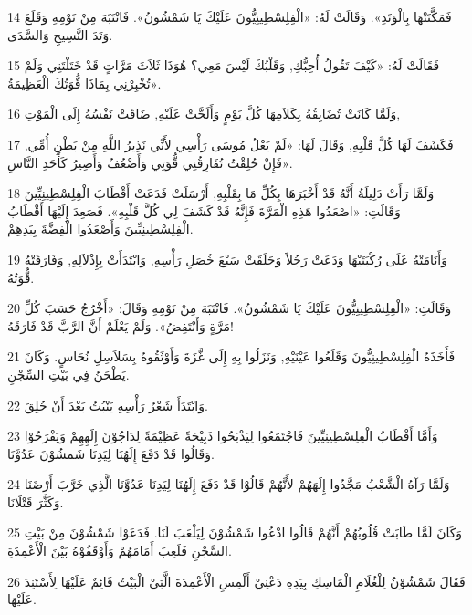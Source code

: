 \par 14 فَمَكَّنَتْهَا بِالْوَتَدِ». وَقَالَتْ لَهُ: «الْفِلِسْطِينِيُّونَ عَلَيْكَ يَا شَمْشُونُ». فَانْتَبَهَ مِنْ نَوْمِهِ وَقَلَعَ وَتَدَ النَّسِيجِ وَالسَّدَى.
\par 15 فَقَالَتْ لَهُ: «كَيْفَ تَقُولُ أُحِبُّكِ, وَقَلْبُكَ لَيْسَ مَعِي؟ هُوَذَا ثَلاَثَ مَرَّاتٍ قَدْ خَتَلْتَنِي وَلَمْ تُخْبِرْنِي بِمَاذَا قُّوَتُكَ الْعَظِيمَةُ».
\par 16 وَلَمَّا كَانَتْ تُضَايِقُهُ بِكَلاَمِهَا كُلَّ يَوْمٍ وَأَلَحَّتْ عَلَيْهِ, ضَاقَتْ نَفْسُهُ إِلَى الْمَوْتِ,
\par 17 فَكَشَفَ لَهَا كُلَّ قَلْبِهِ, وَقَالَ لَهَا: «لَمْ يَعْلُ مُوسَى رَأْسِي لأَنِّي نَذِيرُ اللَّهِ مِنْ بَطْنِ أُمِّي, فَإِنْ حُلِقْتُ تُفَارِقُنِي قُّوَتِي وَأَضْعُفُ وَأَصِيرُ كَأَحَدِ النَّاسِ».
\par 18 وَلَمَّا رَأَتْ دَلِيلَةُ أَنَّهُ قَدْ أَخْبَرَهَا بِكُلِّ مَا بِقَلْبِهِ, أَرْسَلَتْ فَدَعَتْ أَقْطَابَ الْفِلِسْطِينِيِّينَ وَقَالَتِ: «اصْعَدُوا هَذِهِ الْمَرَّةَ فَإِنَّهُ قَدْ كَشَفَ لِي كُلَّ قَلْبِهِ». فَصَعِدَ إِلَيْهَا أَقْطَابُ الْفِلِسْطِينِيِّينَ وَأَصْعَدُوا الْفِضَّةَ بِيَدِهِمْ.
\par 19 وَأَنَامَتْهُ عَلَى رُكْبَتَيْهَا وَدَعَتْ رَجُلاً وَحَلَقَتْ سَبْعَ خُصَلِ رَأْسِهِ, وَابْتَدَأَتْ بِإِذْلاَلِهِ, وَفَارَقَتْهُ قُّوَتُهُ.
\par 20 وَقَالَتِ: «الْفِلِسْطِينِيُّونَ عَلَيْكَ يَا شَمْشُونُ». فَانْتَبَهَ مِنْ نَوْمِهِ وَقَالَ: «أَخْرُجُ حَسَبَ كُلِّ مَرَّةٍ وَأَنْتَفِضُ». وَلَمْ يَعْلَمْ أَنَّ الرَّبَّ قَدْ فَارَقَهُ!
\par 21 فَأَخَذَهُ الْفِلِسْطِينِيُّونَ وَقَلَعُوا عَيْنَيْهِ, وَنَزَلُوا بِهِ إِلَى غَّزَةَ وَأَوْثَقُوهُ بِسَلاَسِلِ نُحَاسٍ. وَكَانَ يَطْحَنُ فِي بَيْتِ السِّجْنِ.
\par 22 وَابْتَدَأَ شَعْرُ رَأْسِهِ يَنْبُتُ بَعْدَ أَنْ حُلِقَ.
\par 23 وَأَمَّا أَقْطَابُ الْفِلِسْطِينِيِّينَ فَاجْتَمَعُوا لِيَذْبَحُوا ذَبِيْحَةً عَظِيْمَةً لِدَاجُوْنَ إِلَهِهِمْ وَيَفْرَحُوْا وَقَالُوا قَدْ دَفَعَ إِلَهُنَا لِيَدِنَا شَمشُوْنَ عَدُوَّنَا.
\par 24 وَلَمَّا رَآهُ الْشَّعْبُ مَجَّدُوا إِلَهَهُمْ لأَنَّهُمْ قَالُوْا قَدْ دَفَعَ إِلَهُنَا لِيَدِنَا عَدُوَّنَا الَّذِي خَرَّبَ أَرْضَنَا وَكَثَّرَ قَتْلَانَا.
\par 25 وَكَانَ لَمَّا طَابَتْ قُلُوبُهُمْ أَنَّهُمْ قَالُوا ادْعُوا شَمْشُوْنَ لِيَلْعَبَ لَنَا. فَدَعَوْا شَمْشُوْنَ مِنْ بَيْتِ السَّجْنِ فَلَعِبَ أَمَامَهُمْ وَأَوْقَفُوْهُ بَيْنَ الْأَعْمِدَةِ.
\par 26 فَقَالَ شَمْشُوْنُ لِلْغُلَامِ الْمَاسِكِ بِيَدِهِ دَعْنِيْ أَلْمِسِ الْأَعْمِدَةَ الَّتِيْ الْبَيْتُ قَائِمٌ عَلَيْهَا لِأَسْتَنِدَ عَلَيْهَا.
